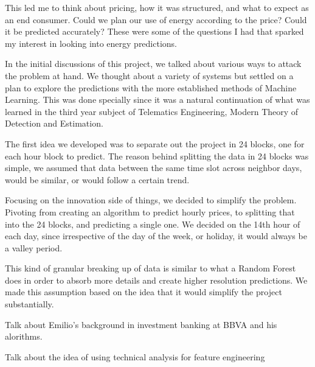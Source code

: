 \documentclass[12pt]{report} %
\begin{document}
This led me to think about pricing, how it was structured, and what to expect as an end consumer.
Could we plan our use of energy according to the price?
Could it be predicted accurately?
These were some of the questions I had that sparked my interest in looking into energy predictions.

In the initial discussions of this project, we talked about various ways to attack the problem at hand.
We thought about a variety of systems but settled on a plan to explore the predictions with the more established methods of Machine Learning.
This was done specially since it was a natural continuation of what was learned in the third year subject of Telematics Engineering, Modern Theory of Detection and Estimation.

The first idea we developed was to separate out the project in 24 blocks, one for each hour block to predict.
The reason behind splitting the data in 24 blocks was simple, we assumed that data between the same time slot across neighbor days, would be similar, or would follow a certain trend.

Focusing on the innovation side of things, we decided to simplify the problem.
Pivoting from creating an algorithm to predict hourly prices, to splitting that into the 24 blocks, and predicting a single one.
We decided on the 14th hour of each day, since irrespective of the day of the week, or holiday, it would always be a valley period.

This kind of granular breaking up of data is similar to what a Random Forest does in order to absorb more details and create higher resolution predictions. We made this assumption based on the idea that it would simplify the project substantially.

Talk about Emilio's background in investment banking at BBVA and his alorithms.

Talk about the idea of using technical analysis for feature engineering



\end{document}
